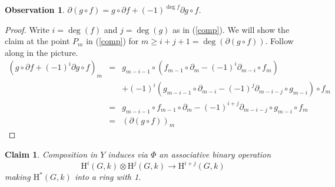 \documentclass[12pt]{article}
\newtheorem{claim}[definition]{Claim}
\newtheorem{observation}[definition]{Observation}
\begin{document}
\begin{observation}\label{differential}
$\displaystyle{\partial\left(g\circ f\right)
=g\circ\partial f
+\left(-1\right)^{\deg f}\partial g\circ f}$.
\end{observation}
\begin{proof} Write $i=\deg\left(f\right)$
and $j=\deg\left(g\right)$ as in (\ref{comp}). 
We will show the claim at the point $P_m$ in (\ref{comp})
for $m\ge i+j+1=\deg\left(\partial\left(g\circ f\right)\right)$.
Follow along in the picture.
\begin{eqnarray*}
\left(g\circ\partial f+\left(-1\right)^i 
\partial g\circ f\right)_m
&=&
g_{m-i-1}\circ
\left(f_{m-1}\circ\partial_m
-\left(-1\right)^i\partial_{m-i}\circ f_m
\right)\\
&&+\left(-1\right)^i\left(
g_{m-i-1}\circ\partial_{m-i}
-\left(-1\right)^j
\partial_{m-i-j}\circ g_{m-i}\right)
\circ f_m\\
&=&g_{m-i-1}\circ f_{m-1}\circ\partial_m
-\left(-1\right)^{i+j}
\partial_{m-i-j}\circ g_{m-i}\circ f_m\\
&=&\left(\partial\left(g\circ f\right)
\right)_m
\end{eqnarray*}
\end{proof}
\begin{claim}
Composition in $Y$ induces via $\Phi$ an associative binary operation 
\[\mathrm{H}^i\left(G,k\right)
\otimes\mathrm{H}^j\left(G,k\right)
\to\mathrm{H}^{i+j}\left(G,k\right)\]
making $\mathrm{H}^\ast\left(G,k\right)$ into a ring with 1.
\end{claim}
\end{document}
